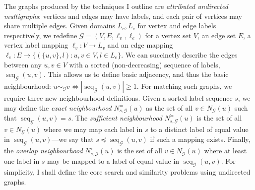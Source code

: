 \documentclass{mpaper}
\begin{document}
The graphs produced by the techniques I outline are \emph{attributed undirected multigraphs}: vertices and edges may have labels, and each pair of vertices may share multiple edges.
Given domains $L_v, L_e$ for vertex and edge labels respectively, we redefine $\mathcal{G} = (V,E,\ell_v,\ell_e)$ for a vertex set $V$, an edge set $E$, a vertex label mapping $\ell_v: V \rightarrow L_v$ and an edge mapping $\ell_e: E \rightarrow \lbrace(\lbrace u,v \rbrace, l): u,v \in V, l \in L_e\rbrace$.
We can succinctly describe the edges between any $u, v \in V$ with a sorted (non-decreasing) sequence of labels, $\operatorname{seq}_\mathcal{G}(u, v)$.
This allows us to define basic adjacency, and thus the basic neighbourhood: $u \sim_\mathcal{G} v \iff |\operatorname{seq}_\mathcal{G}(u,v)| \ge 1$.
For matching such graphs, we require three new neighbourhood definitions.
Given a sorted label sequence $s$, we may define the \emph{exact neighbourhood} $N^{=}_{s,\mathcal{G}}(u)$ as the set of all $v \in N_\mathcal{G}(u)$ such that $\operatorname{seq}_\mathcal{G}(u,v)=s$.
The \emph{sufficient neighbourhood} $N^{\succcurlyeq}_{s,\mathcal{G}}(u)$ is the set of all $v \in N_\mathcal{G}(u)$ where we may map each label in $s$ to a distinct label of equal value in $\operatorname{seq}_\mathcal{G}(u,v)$---we say that $s \preccurlyeq \operatorname{seq}_\mathcal{G}(u,v)$ if such a mapping exists.
Finally, the \emph{overlap neighbourhood} $N^{\circ}_{s,\mathcal{G}}(u)$ is the set of all $v \in N_\mathcal{G}(u)$ where at least one label in $s$ may be mapped to a label of equal value in $\operatorname{seq}_\mathcal{G}(u,v)$.
For simplicity, I shall define the core search and similarity problems using undirected graphs.
\end{document}
